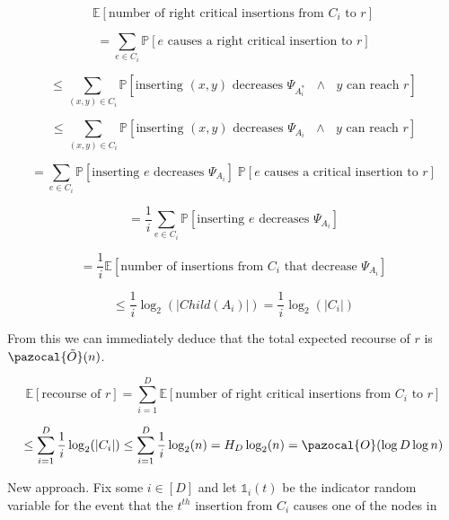 \documentclass{article}
\begin{document}
\[
\mathbb{E} [\textrm{number of right critical insertions from  $C_i$ to $r$}]
\]

\[
= \sum_{e \in C_i} \mathbb{P}[\textrm{$e$ causes a right critical insertion to $r$}]
\]

\[
\leq \sum_{(x,y) \in C_i} \mathbb{P}[\textrm{inserting $(x,y)$ decreases $\Psi_{A_i^*}$ $\land$ $y$ can reach $r$}]
\]

\[
\leq \sum_{(x,y) \in C_i} \mathbb{P}[\textrm{inserting $(x,y)$ decreases $\Psi_{A_i}$ $\land$ $y$ can reach $r$}]
\]

\[
= \sum_{e \in C_i} \mathbb{P}[\textrm{inserting $e$ decreases $\Psi_{A_i}$}] \; \mathbb{P}[\textrm{$e$ causes a critical insertion to $r$}]
\]

\[
= \frac{1}{i} \sum_{e \in C_i} \mathbb{P}[\textrm{inserting $e$ decreases $\Psi_{A_i}$}]
\]

\[
= \frac{1}{i} \mathbb{E}[\textrm{number of insertions from $C_i$ that decrease $\Psi_{A_i}$}]
\]

\[
\leq \frac{1}{i} \log_2(\vert Child(A_i) \vert) = \frac{1}{i} \log_2(\vert C_{i} \vert)
\]

From this we can immediately deduce that the total expected recourse of $r$ is $\pazocal{\tilde O}(n)$.

\[
\mathbb{E} [\textrm{recourse of $r$}] = \sum_{i=1}^D \mathbb{E}[\textrm{number of right critical insertions from $C_i$ to $r$}]
\]

\[
\leq \sum_{i=1}^D \frac{1}{i} \log_2(\vert C_{i} \vert) \leq \sum_{i=1}^D \frac{1}{i} \log_2(n) = H_D\log_2(n) = \pazocal{O}(\log D \log n)
\]

New approach. Fix some $i \in [D]$ and let $\mathds{1}_i(t)$ be the indicator random variable for the event that the $t^{th}$ insertion from $C_i$ causes one of the nodes in 
\end{document}
